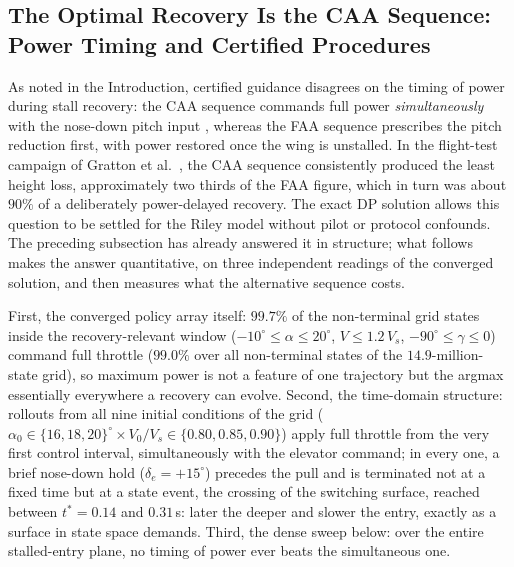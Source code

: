\subsection{The Optimal Recovery Is the CAA Sequence: Power Timing and
Certified Procedures}
\label{sec:caa_faa}

As noted in the Introduction, certified guidance disagrees on the
timing of power during stall recovery: the CAA sequence commands full
power \emph{simultaneously} with the nose-down pitch input
\cite{CAA2009}, whereas the FAA sequence \cite{FAA2021} prescribes the
pitch reduction first, with power restored once the wing is
unstalled. In the
flight-test campaign of Gratton et al.\ \cite{Gratton2014}, the CAA
sequence consistently produced the least height loss, approximately
two thirds of the FAA figure, which in turn was about $90\%$ of a
deliberately power-delayed recovery. The exact DP solution allows this
question to be settled for the Riley model without pilot or protocol
confounds. The preceding subsection has already answered it in
structure; what follows makes the answer quantitative, on three
independent readings of the converged solution, and then measures what
the alternative sequence costs.

First, the converged
policy array itself: $99.7\%$ of the non-terminal grid states inside
the recovery-relevant window ($-10^\circ \le \alpha \le 20^\circ$,
$V \le 1.2\,V_s$, $-90^\circ \le \gamma \le 0$) command full throttle
($99.0\%$ over all non-terminal states of the $14.9$-million-state
grid), so maximum power is
not a feature of one trajectory but the argmax essentially everywhere
a recovery can evolve. Second, the time-domain structure: rollouts
from all nine initial conditions of the grid
($\alpha_0 \in \{16, 18, 20\}^\circ \times V_0/V_s \in
\{0.80, 0.85, 0.90\}$) apply full throttle from the very first control
interval, simultaneously with the elevator command; in every one, a
brief nose-down hold ($\delta_e = +15^\circ$) precedes the
pull and is terminated not at a fixed time but at a state event,
the crossing of the switching surface, reached
between $t^\ast = 0.14$ and $0.31$\,s: later the deeper and slower
the entry, exactly as a surface in state space demands. Third, the
dense sweep below: over the entire stalled-entry plane, no timing of
power ever beats the simultaneous one.

